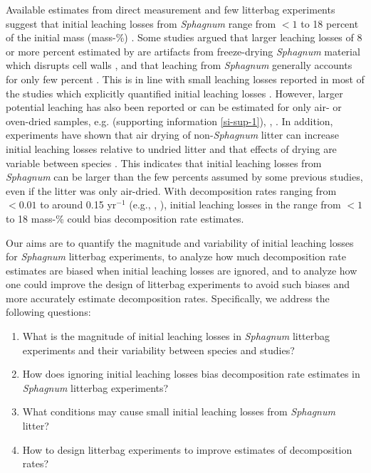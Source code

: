 \documentclass[bg, manuscript]{copernicus}
\begin{document}
Available estimates from direct measurement and few litterbag experiments suggest that initial leaching losses from \emph{Sphagnum} range from \(<1\) to 18 percent of the initial mass (mass-\%) \citep{Coulson.1978, Scheffer.2001, Moore.2001, Thormann.2002, Limpens.2003, Castells.2005, Moore.2007, DelGiudice.2017, Mastny.2018, Muller.2023}. Some studies argued that larger leaching losses of 8 or more percent estimated by \citet{Scheffer.2001} are artifacts from freeze-drying \emph{Sphagnum} material which disrupts cell walls \citep{Limpens.2003}, and that leaching from \emph{Sphagnum} generally accounts for only few percent \citep{Johnson.1991}. This is in line with small leaching losses reported in most of the studies which explicitly quantified initial leaching losses \citep{Coulson.1978, Moore.2001, Thormann.2002, Limpens.2003, Castells.2005, Mastny.2018}. However, larger potential leaching has also been reported or can be estimated for only air- or oven-dried samples, e.g. \citet{Moore.2007} (supporting information \ref{si-sup-1}), \citet{Thormann.2001}, \citet{Muller.2023}. In addition, experiments have shown that air drying of non-\emph{Sphagnum} litter can increase initial leaching losses relative to undried litter \citep{Gessner.1989, Barlocher.1997} and that effects of drying are variable between species \citep{Taylor.1996}. This indicates that initial leaching losses from \emph{Sphagnum} can be larger than the few percents assumed by some previous studies, even if the litter was only air-dried. With decomposition rates ranging from \(<0.01\) to around 0.15 yr\(^{-1}\) (e.g., \citet{Moore.2007}, \citet{Turetsky.2008}), initial leaching losses in the range from \(<1\) to 18 mass-\% could bias decomposition rate estimates.

Our aims are to quantify the magnitude and variability of initial leaching losses for \emph{Sphagnum} litterbag experiments, to analyze how much decomposition rate estimates are biased when initial leaching losses are ignored, and to analyze how one could improve the design of litterbag experiments to avoid such biases and more accurately estimate decomposition rates. Specifically, we address the following questions:

\begin{enumerate}
\def\labelenumi{\arabic{enumi}.}
\item
  What is the magnitude of initial leaching losses in \emph{Sphagnum} litterbag experiments and their variability between species and studies?
\item
  How does ignoring initial leaching losses bias decomposition rate estimates in \emph{Sphagnum} litterbag experiments?
\item
  What conditions may cause small initial leaching losses from \emph{Sphagnum} litter?
\item
  How to design litterbag experiments to improve estimates of decomposition rates?
\end{enumerate}
\end{document}
